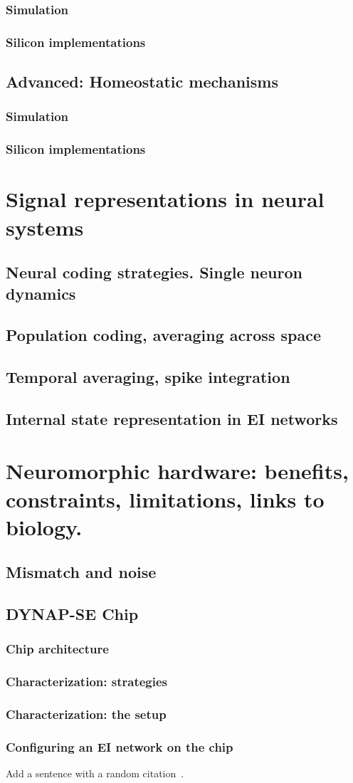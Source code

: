 \subsubsection{Simulation}
\subsubsection{Silicon implementations}
\subsection{Advanced: Homeostatic mechanisms}
\subsubsection{Simulation}
\subsubsection{Silicon implementations}


\section{Signal representations in neural systems}
\subsection{Neural coding strategies. Single neuron dynamics}
\subsection{Population coding, averaging across space}
\subsection{Temporal averaging, spike integration}
\subsection{Internal state representation in EI networks}

\section{Neuromorphic hardware: benefits, constraints, limitations, links to biology.}
\subsection{Mismatch and noise}
\subsection{DYNAP-SE Chip}
\subsubsection{Chip architecture}
\subsubsection{Characterization: strategies}
\subsubsection{Characterization: the setup}
\subsubsection{Configuring an EI network on the chip}

Add a sentence with a random citation~\cite{AER-Caltech-Memo}.